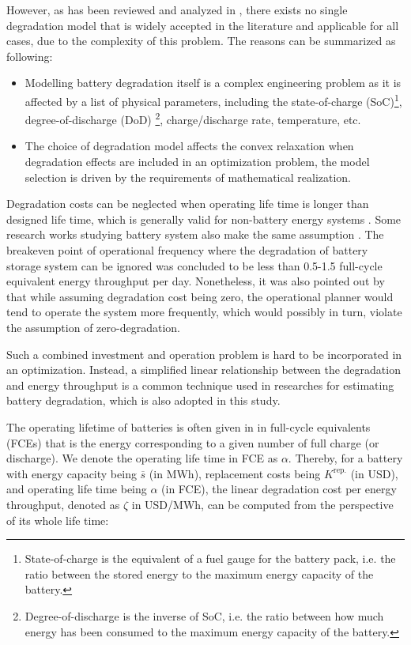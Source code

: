 However, as has been reviewed and analyzed in \cite{Megel2017}, there exists no single degradation model that is widely accepted in the literature and applicable for all cases, due to the complexity of this problem. The reasons can be summarized as following:
\begin{itemize}
	\item Modelling battery degradation itself is a complex engineering problem as it is affected by a list of physical parameters, including the state-of-charge (SoC)\footnote{State-of-charge is the equivalent of a fuel gauge for the battery pack, i.e. the ratio between the stored energy to the maximum energy capacity of the battery.}, degree-of-discharge (DoD) \footnote{Degree-of-discharge is the inverse of SoC, i.e. the ratio between how much energy has been consumed to the maximum energy capacity of the battery.},  charge/discharge rate, temperature, etc.\cite{Barre2013}
	\item The choice of degradation model affects the convex relaxation when degradation effects are included in an optimization problem, the model selection is driven by the requirements of mathematical realization. \cite{Megel2017}
\end{itemize}

Degradation costs can be neglected when operating life time is longer than designed life time, which is generally valid for non-battery energy systems \cite{Bradbury2014}\cite{Zafirakis2016}\cite{Connolly2011}. Some research works studying battery system also make the same assumption  \cite{Byrne2012}\cite{McConnell2015}\cite{Sioshansi2009}. The breakeven point of operational frequency where the degradation of battery storage system can be ignored was concluded to be less than 0.5-1.5 full-cycle equivalent energy throughput per day\cite{Megel2017}. Nonetheless, it was also pointed out by \cite{Megel2017} that while assuming degradation cost being zero, the operational planner would tend to operate the system more frequently, which would possibly in turn, violate the assumption of zero-degradation.

Such a combined investment and operation problem is hard to be incorporated in an optimization. Instead, a simplified linear relationship between the degradation and energy throughput is a common technique used in researches for estimating battery degradation\cite{Byrne2012}\cite{Berrada2016}, which is also adopted in this study. 

The operating lifetime of batteries is often given in in full-cycle equivalents (FCEs) that is the energy corresponding to a given number of full charge (or discharge). We denote the operating life time in FCE as $\alpha$. Thereby, for a battery with energy capacity being $\overline{s}$ (in MWh), replacement costs being $K^{\text{rep.}}$ (in USD), and operating life time being $\alpha$ (in FCE), the linear degradation cost per energy throughput, denoted as $\zeta$ in USD/MWh, can be computed from the perspective of its whole life time:

